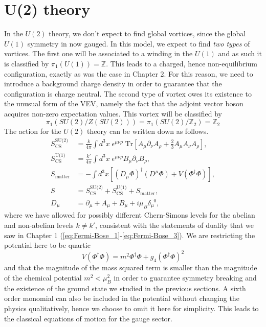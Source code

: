 \section{U(2) theory}
In the $U(2)$ theory, we don't expect to find global vortices, since the global $U(1)$ symmetry in now gauged. In this model, we expect to find \textit{two types} of vortices. The first one will be associated to a winding in the $U(1)$ and as such it is classified by $\pi_1(U(1))= \mathbb{Z}$. This leads to a charged, hence non-equilibrium configuration, exactly as was the case in Chapter 2. For this reason, we need to introduce a background charge density in order to guarantee that the configuration is charge neutral. The second type of vortex owes its existence to the unusual form of the VEV, namely the fact that the adjoint vector boson acquires non-zero expectation values. This vortex will be classified by $$\pi_1(SU(2)/Z(SU(2)))= \pi_1(SU(2)/\mathbb{Z}_2) = \mathbb{Z}_2$$ The action for the $U(2)$ theory can be written down as follows.    
\begin{align}
    S^{\text{SU(2)}}_{\text{CS}} &= \frac{k}{4 \pi} \int d^3x \; \epsilon^{\mu \nu \rho} \; \mathrm{Tr} \left[A_{\mu} \partial_{\nu}A_{\rho}+ \frac{2}{3} A_{\mu} A_{\nu}A_{\rho} \right], \\
    S^{\text{U(1)}}_{\text{CS}} &= \frac{k'}{4 \pi} \int d^3x \; \epsilon^{\mu \nu \rho} B_{\mu} \partial_{\nu} B_{\rho},\\
    S_{\text{matter}}&= - \int d^3x \left[ \left(D_{\mu} \Phi \right)^{\dag} \left(D^{\mu} \Phi \right) + V\left(\Phi^{\dag}\Phi \right)\right], \\
    S &= S^{\text{SU(2)}}_{\text{CS}} + S^{\text{U(1)}}_{\text{CS}} + S_{\text{matter}}, \\
    D_{\mu} &= \partial_{\mu} + A_{\mu}+B_{\mu} +i \mu_B \delta_{\mu}^{\;\; 0},
\end{align}
where we have allowed for possibly different Chern-Simons levels for the abelian and non-abelian levels $k\neq k'$, consistent with the statements of duality that we saw in Chapter 1 (\ref{eq:Fermi-Bose_1}-\ref{eq:Fermi-Bose_3}). We are restricting the potential  here to be quartic $$V\left(\Phi^{\dag} \Phi \right)= m^2 \Phi^{\dag} \Phi + g_4\left( \Phi^{\dag} \Phi\right)^2$$and that the magnitude of the mass squared term is smaller than the magnitude of the chemical potential $m^2<\mu_B^2$ in order to guarantee symmetry breaking and the existence of the ground state we studied in the previous sections. A sixth order monomial can also be included in the potential without changing the physics qualitatively, hence we choose to omit it here for simplicity. This leads to the classical equations of motion for the gauge sector.
